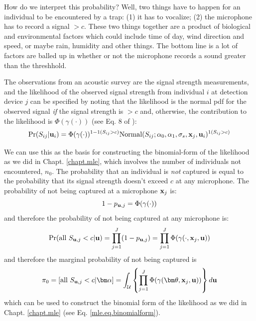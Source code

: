 How do we interpret this probability? Well, two things have to happen
for an individual to be encountered by a trap:
(1)  it has to  vocalize; (2)
the microphone has to record a signal $>c$. These two things
together are a product of biological and environmental factors which
could include time of day, wind direction and speed, or maybe rain,
humidity and other things. The bottom line is a lot of factors are
balled up in whether or not the microphone records a sound greater
than the threshhold.  

The observations from an acoustic survey are the signal strength
measurements, and
the likelihood of the observed signal strength
from individual $i$ at detection
device $j$ can be specified by noting that
the
likelihood is the normal pdf for the observed signal {\it if} the
signal strength is $>c$ and, otherwise, the contribution to the
likelihood is $\Phi(\gamma(\cdot))$ (see Eq. 8 of \citet{efford_etal:2009ecol}):
\[
\Pr(S_{ij}| {\bf u}_{i} ) = \Phi( \gamma( \cdot) )^{1-1(S_{ij}>c)}
\mbox{Normal}(S_{ij};\alpha_{0},\alpha_{1},\sigma_{s},{\bf x}_{j},{\bf
u}_{i})^{1(S_{ij}>c)}
\]

We can use this as the basis for constructing the binomial-form of the
likelihood as we did in Chapt. \ref{chapt.mle}, which involves the
number of individuals not encountered, $n_{0}$.  The probability that
an individual is {\it not} captured is equal to the probability that
its signal strength doesn't exceed $c$ at any microphone.  The
probability of not being captured at a microphone ${\bf x}_{j}$ is:
\[
1-p_{{\bf u},j} = \Phi( \gamma(\cdot) )
\]
and therefore the probability of not being captured at any microphone is:
\[
\Pr(\mbox{all } S_{{\bf u},j} < c | {\bf u}) = \prod_{j=1}^{J} ( 1-p_{{\bf u},j} )
= \prod_{j=1}^{J} \Phi( \gamma(\cdot, {\bf x}_{j}, {\bf u}) )
\]
and therefore the marginal probability of not being captured is
\[
\pi_{0} = [ \mbox{all }  S_{{\bf u},j} < c | {\bm \alpha}] =
\int_{{\cal U}}
 \left\{
\prod_{j=1}^{J} \Phi( \gamma( {\bm \theta}, {\bf x}_{j}, {\bf u}) )
 \right\}
 d{\bf u}
\]
which can be used to construct the binomial form of the likelihood as
we did in Chapt. \ref{chapt.mle} (see Eq. \ref{mle.eq.binomialform}).




